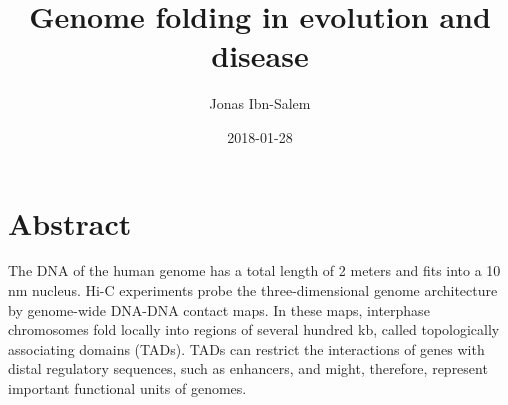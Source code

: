 \documentclass[a4paper,twoside=true,openright,parskip=full,chapterprefix=true,11pt,headings=normal,bibliography=totoc,listof=totoc,titlepage=on,captions=tableabove,draft=false]{scrreprt}
\title{Genome folding in evolution and disease}
\author{Jonas Ibn-Salem}
\date{2018-01-28}
\theoremstyle{definition}
\theoremstyle{definition}
\theoremstyle{definition}
\theoremstyle{remark}
\begin{document}




\pagestyle{empty}				%
\cleardoublepage

\pagestyle{plain}				%
\cleardoublepage
%
%

\setcounter{page}{1}			%
\pagestyle{maincontentstyle} 	%

{
\setcounter{tocdepth}{1}
\tableofcontents
}
\chapter*{Abstract}\label{abstract}

The DNA of the human genome has a total length of 2 meters and fits into
a 10 nm nucleus. Hi-C experiments probe the three-dimensional genome
architecture by genome-wide DNA-DNA contact maps. In these maps,
interphase chromosomes fold locally into regions of several hundred kb,
called topologically associating domains (TADs). TADs can restrict the
interactions of genes with distal regulatory sequences, such as
enhancers, and might, therefore, represent important functional units of
genomes.
\end{document}
